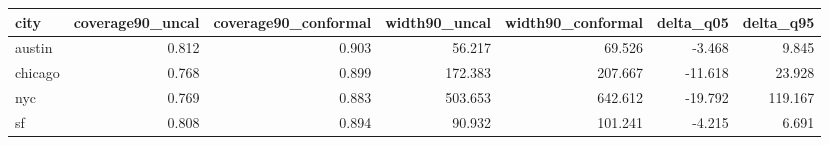 \begin{tabular}{lrrrrrr}
\toprule
city & coverage90\_uncal & coverage90\_conformal & width90\_uncal & width90\_conformal & delta\_q05 & delta\_q95 \\
\midrule
austin & 0.812 & 0.903 & 56.217 & 69.526 & -3.468 & 9.845 \\
chicago & 0.768 & 0.899 & 172.383 & 207.667 & -11.618 & 23.928 \\
nyc & 0.769 & 0.883 & 503.653 & 642.612 & -19.792 & 119.167 \\
sf & 0.808 & 0.894 & 90.932 & 101.241 & -4.215 & 6.691 \\
\bottomrule
\end{tabular}
